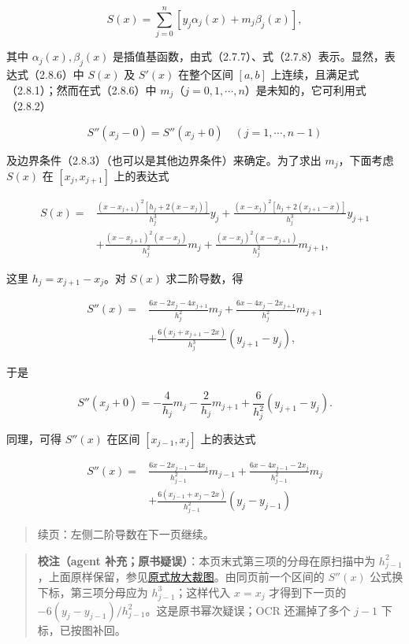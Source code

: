 \documentclass[
  10pt,
  fontset=fandol]{ctexart}
\begin{document}
\[S(x)=\sum_{j=0}^n[y_j\alpha_j(x)+m_j\beta_j(x)],\tag{2.8.6}\]

其中 \(\alpha_j(x),\beta_j(x)\) 是插值基函数，由式（2.7.7）、式（2.7.8）表示。显然，表达式（2.8.6）中 \(S(x)\) 及 \(S'(x)\) 在整个区间 \([a,b]\) 上连续，且满足式（2.8.1）；然而在式（2.8.6）中 \(m_j\)（\(j=0,1,\cdots,n\)）是未知的，它可利用式（2.8.2）

\[S''(x_j-0)=S''(x_j+0)\quad(j=1,\cdots,n-1)\]

及边界条件（2.8.3）（也可以是其他边界条件）来确定。为了求出 \(m_j\)，下面考虑 \(S(x)\) 在 \([x_j,x_{j+1}]\) 上的表达式

\[\begin{aligned}
S(x)={}&\frac{(x-x_{j+1})^2[h_j+2(x-x_j)]}{h_j^3}y_j+\frac{(x-x_j)^2[h_j+2(x_{j+1}-x)]}{h_j^3}y_{j+1}\\
&+\frac{(x-x_{j+1})^2(x-x_j)}{h_j^2}m_j+\frac{(x-x_j)^2(x-x_{j+1})}{h_j^2}m_{j+1},
\end{aligned}\tag{2.8.7}\]

这里 \(h_j=x_{j+1}-x_j\)。对 \(S(x)\) 求二阶导数，得

\[\begin{aligned}
S''(x)={}&\frac{6x-2x_j-4x_{j+1}}{h_j^2}m_j+\frac{6x-4x_j-2x_{j+1}}{h_j^2}m_{j+1}\\
&+\frac{6(x_j+x_{j+1}-2x)}{h_j^3}(y_{j+1}-y_j),
\end{aligned}\]

于是

\[S''(x_j+0)=-\frac4{h_j}m_j-\frac2{h_j}m_{j+1}+\frac6{h_j^2}(y_{j+1}-y_j).\]

同理，可得 \(S''(x)\) 在区间 \([x_{j-1},x_j]\) 上的表达式

\[\begin{aligned}
S''(x)={}&\frac{6x-2x_{j-1}-4x_j}{h_{j-1}^2}m_{j-1}+\frac{6x-4x_{j-1}-2x_j}{h_{j-1}^2}m_j\\
&+\frac{6(x_{j-1}+x_j-2x)}{h_{j-1}^2}(y_j-y_{j-1})
\end{aligned}\]

\begin{quote}
续页：左侧二阶导数在下一页继续。
\end{quote}

\begin{quote}
\textbf{校注（agent 补充；原书疑误）}：本页末式第三项的分母在原扫描中为 \(h_{j-1}^2\)，上面原样保留，参见\href{../assets/ch02b/pdf-050-second-derivative-detail.png}{原式放大裁图}。由同页前一个区间的 \(S''(x)\) 公式换下标，第三项分母应为 \(h_{j-1}^3\)；这样代入 \(x=x_j\) 才得到下一页的 \(-6(y_j-y_{j-1})/h_{j-1}^2\)。这是原书幂次疑误；OCR 还漏掉了多个 \(j-1\) 下标，已按图补回。
\end{quote}
\end{document}
